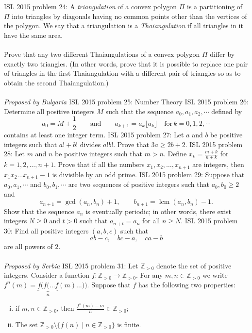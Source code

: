 ISL 2015 problem 24:  A \textit{triangulation} of a convex polygon $\Pi$ is a partitioning of $\Pi$ into triangles by diagonals having no common points other than the vertices of the polygon. We say that a triangulation is a \textit{Thaiangulation} if all triangles in it have the same area. \\\\
Prove that any two different Thaiangulations of a convex polygon $\Pi$ differ by exactly two triangles. (In other words, prove that it is possible to replace one pair of triangles in the first Thaiangulation with a different pair of triangles so as to obtain the second Thaiangulation.) \\\\
\textit{Proposed by Bulgaria} 
ISL 2015 problem 25:  Number Theory 
ISL 2015 problem 26:  Determine all positive integers $M$ such that the sequence $a_0, a_1, a_2, \cdots$ defined by
\[
a_0 = M + \frac{1}{2}   \qquad  \textrm{and} \qquad    a_{k+1} = a_k\lfloor a_k \rfloor   \quad \textrm{for} \, k = 0, 1, 2, \cdots
\]
contains at least one integer term. 
ISL 2015 problem 27:  Let $a$ and $b$ be positive integers such that $a! + b!$ divides $a!b!$. Prove that $3a \ge 2b + 2$. 
ISL 2015 problem 28:  Let $m$ and $n$ be positive integers such that $m>n$. Define $x_k=\frac{m+k}{n+k}$ for $k=1,2,\ldots,n+1$. Prove that if all the numbers $x_1,x_2,\ldots,x_{n+1}$ are integers, then $x_1x_2\ldots x_{n+1}-1$ is divisible by an odd prime. 
ISL 2015 problem 29:  Suppose that $a_0, a_1, \cdots $ and $b_0, b_1, \cdots$ are two sequences of positive integers such that $a_0, b_0 \ge 2$ and
\[ a_{n+1} = \gcd{(a_n, b_n)} + 1, \qquad b_{n+1} = \operatorname{lcm}{(a_n, b_n)} - 1. \]
Show that the sequence $a_n$ is eventually periodic; in other words, there exist integers $N \ge 0$ and $t > 0$ such that $a_{n+t} = a_n$ for all $n \ge N$. 
ISL 2015 problem 30:  Find all positive integers $(a,b,c)$ such that
\[ ab-c,\quad bc-a,\quad ca-b \]
are all powers of $2$. \\\\
\textit{Proposed by Serbia} 
ISL 2015 problem 31:  Let $\mathbb{Z}_{>0}$ denote the set of positive integers. Consider a function $f: \mathbb{Z}_{>0} \to \mathbb{Z}_{>0}$. For any $m, n \in \mathbb{Z}_{>0}$ we write $f^n(m) = \underbrace{f(f(\ldots f}_n(m)\ldots))$. Suppose that $f$ has the following two properties:
\begin{enumerate}[(i)]
  \item if $m, n \in \mathbb{Z}_{>0}$, then $\frac{f^n(m) - m}{n} \in \mathbb{Z}_{>0}$;
  \item The set $\mathbb{Z}_{>0} \setminus \{f(n) \mid n\in \mathbb{Z}_{>0}\}$ is finite.
\end{enumerate}
